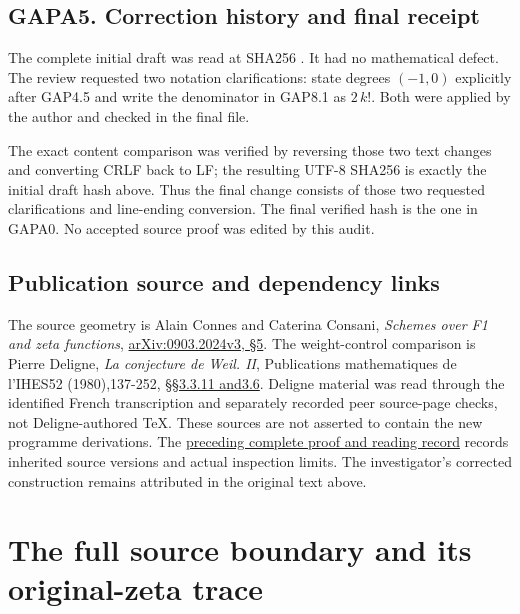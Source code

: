 \section{GAPA5. Correction history and final
receipt}\label{gapa5.-correction-history-and-final-receipt}

The complete initial draft was read at SHA256
.
It had no mathematical defect. The review requested two notation
clarifications: state degrees \((-1,0)\) explicitly after GAP4.5 and
write the denominator in GAP8.1 as \(2\,k!\). Both were applied by the
author and checked in the final file.

The exact content comparison was verified by reversing those two text
changes and converting CRLF back to LF; the resulting UTF-8 SHA256 is
exactly the initial draft hash above. Thus the final change consists of
those two requested clarifications and line-ending conversion. The final
verified hash is the one in GAPA0. No accepted source proof was edited
by this audit.

\section{Publication source and dependency
links}\label{publication-source-and-dependency-links-3}

The source geometry is Alain Connes and Caterina Consani, \emph{Schemes
over F1 and zeta functions},
\href{https://arxiv.org/abs/0903.2024v3}{arXiv:0903.2024v3, §5}. The
weight-control comparison is Pierre Deligne, \emph{La conjecture de
Weil. II}, Publications mathematiques de l'IHES52 (1980),137-252,
\href{https://www.numdam.org/item/PMIHES_1980__52__137_0/}{§§3.3.11
and3.6}. Deligne material was read through the identified French
transcription and separately recorded peer source-page checks, not
Deligne-authored TeX. These sources are not asserted to contain the new
programme derivations. The
\href{https://github.com/KokunoYumeto/zeta-function-research-reader/blob/36a82ecca98addb8a98b48204e349737856c7223/workbenches/splitzero-tandem/continuations/20260924-cohomology-weight-and-character-lifts/BUILD_AND_REVIEW.md}{preceding
complete proof and reading record} records inherited source versions and
actual inspection limits. The investigator's corrected construction
remains attributed in the original text above.

\chapter{The full source boundary and its original-zeta
trace}\label{the-full-source-boundary-and-its-original-zeta-trace}

